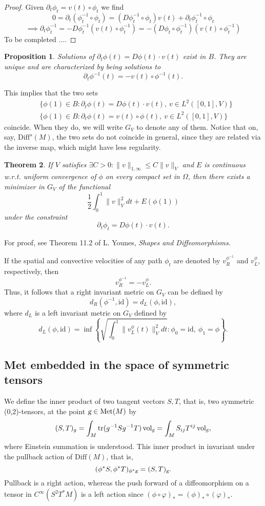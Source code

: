 \documentclass{article}
\theoremstyle{plain}
\newtheorem{teo}{Theorem}[section]
\newtheorem{prop}[teo]{Proposition}
\theoremstyle{definition}
\newcommand{\g}{\ensuremath{\textsl{g}}}
\newcommand{\Diff}{\ensuremath{\mathrm{Diff}}}
\newcommand{\Met}{\ensuremath{\mathrm{Met}}}
\newcommand{\Vol}{\ensuremath{\mathrm{vol}}}
\newcommand{\id}{\ensuremath{\mathrm{id}}}
\newcommand{\tr}{\ensuremath{\mathrm{tr}}}
\begin{document}
\begin{proof}
Given $\partial_t\phi_t = v(t)\circ \phi_t$ we find
\[
 0= \partial_t(\phi^{-1}_t\circ\phi_t )=\left(D\phi^{-1}_t\circ \phi_t\right) v(t)+\partial_t\phi^{-1}_t\circ\phi_t 
\]
\[
\implies \partial_t\phi^{-1}_t=-D\phi_t^{-1} \left(v(t)\circ\phi_t^{-1}\right)=-\left(D\phi_t\circ\phi_t^{-1}\right)\left(v(t)\circ\phi_t^{-1}\right)
\]
To be completed ....
\end{proof}

\begin{prop}
Solutions of $\partial_t\phi(t)=D\phi(t)\cdot v(t)$ exist in $B$. They are unique and are characterized by being solutions to 
\[
\partial_t\phi^{-1}(t)=-v(t)\circ \phi^{-1}(t).
\]
\end{prop}
This implies that the two sets
%
\begin{align*}
&\{\phi(1)\in B : \partial_t\phi(t)=D\phi(t)\cdot v(t),\ v\in L^2([0,1],V)\} \\
&\{\phi(1)\in B : \partial_t\phi(t)=v(t)\circ \phi(t),\ v\in L^2([0,1],V)\}
\end{align*}
%
coincide. When they do, we will write $G_V$ to denote any of them. Notice that on, say, $\Diff^s(M)$, the two sets do not coincide in general, since they are related via the inverse map, which might have less regularity.

\begin{teo}
If $V$ satisfies $\exists C>0: \|v\|_{1,\infty}\leq C\|v\|_V$ and $E$ is continuous w.r.t. uniform convergence of $\phi$ on every compact set in $\Omega$, then there exists a minimizer in $G_V$ of the functional 
\[
  \frac{1}{2}\int_0^1\|v\|^2_Vdt + E(\phi(1))
\]
under the constraint
\[
\partial_t\phi_t=D\phi(t)\cdot v(t).
\]
\end{teo}

For proof, see Theorem 11.2 of L. Younes, \textit{Shapes and Diffeomorphisms}.

If the spatial and convective velocities of any path $\phi_t$ are denoted by $v_R^{\phi^{-1}}$ and $v_L^\phi$, respectively, then 
\[
v_R^{\phi^{-1}}=-v_L^\phi.
\]
Thus, it follows that a right invariant metric on $G_V$ can be defined by
\[
d_R(\phi^{-1},\id)=d_L(\phi,\id),
\]
where $d_L$ is a left invariant metric on $G_V$ defined by
\[
 d_L(\phi,\id)=\inf\left\{\sqrt{\int_0^1\|v_L^\phi(t)\|_V^2 dt}: \phi_0=\id,\ \phi_1=\phi \right\}.
\]


\subsection{Met embedded in the space of symmetric tensors}
We define the inner product of two tangent vectors $S,T$, that is, two symmetric (0,2)-tensors, at the point $\g\in\Met(M)$ by
\[
(S,T)_g=\int_M \tr(g^{-1}Sg^{-1}T)\,\Vol_\g = \int_M S_{ij}T^{ij}\,\Vol_\g,
\]
where Einstein summation is understood. This inner product in invariant under the pullback action of $\Diff(M)$, that is,
\[
(\phi^*S,\phi^*T)_{\phi^*\g}=(S,T)_\g.
\]
Pullback is a right action, whereas the push forward of a diffeomorphism on a tensor in $C^\infty(S^2T^*M)$ is a left action since $(\phi\circ\varphi)_*=(\phi)_*\circ(\varphi)_*$. 
\end{document}
